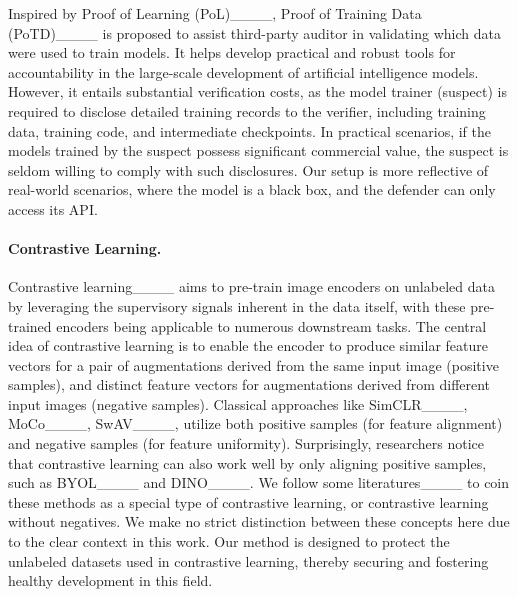 Inspired by Proof of Learning (PoL)____, Proof of Training Data (PoTD)____ is proposed to assist third-party auditor in validating which data were used to train models. It helps develop practical and robust tools for accountability in the large-scale development of artificial intelligence models. However, it entails substantial verification costs, as the model trainer (suspect) is required to disclose detailed training records to the verifier, including training data, training code, and intermediate checkpoints. In practical scenarios, if the models trained by the suspect possess significant commercial value, the suspect is seldom willing to comply with such disclosures. Our setup is more reflective of real-world scenarios, where the model is a black box, and the defender can only access its API. 


\paragraph{Contrastive Learning.}


Contrastive learning____ aims to pre-train image encoders on unlabeled data by leveraging the supervisory signals inherent in the data itself, with these pre-trained encoders being applicable to numerous downstream tasks. The central idea of contrastive learning is to enable the encoder to produce similar feature vectors for a pair of augmentations derived from the same input image (positive samples), and distinct feature vectors for augmentations derived from different input images (negative samples). Classical approaches like SimCLR____, MoCo____, SwAV____, utilize both positive samples (for feature alignment) and negative samples (for feature uniformity). Surprisingly, researchers notice that contrastive learning can also work well by only aligning positive samples, such as BYOL____ and DINO____. We follow some literatures____ to coin these methods as a special type of contrastive learning, or contrastive learning without negatives. We make no strict distinction between these concepts here due to the clear context in this work. Our method is designed to protect the unlabeled datasets used in contrastive learning, thereby securing and fostering healthy development in this field.